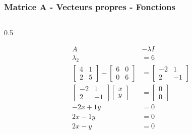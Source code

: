 \begin{frame}
    \frametitle{Matrice A - Vecteurs propres - Fonctions}

		\begin{columns}
		\begin{column}{0.5\textwidth}

			\scriptsize{\begin{align}
			A&-\lambda I \nonumber \\
				\lambda_2&=6 \nonumber \\
				\begin{bmatrix} 4&1\\ 2&5 \end{bmatrix}
				  - \begin{bmatrix} 6&0\\ 0&6 \end{bmatrix}
				  &= \begin{bmatrix} -2&1\\ 2&-1 \end{bmatrix} \\
				\begin{bmatrix} -2&1\\ 2&-1 \end{bmatrix}
				  \begin{bmatrix} x\\y \end{bmatrix}
				  &= \begin{bmatrix} 0\\0 \end{bmatrix} \\
				-2x+1y&=0 \\
				2x-1y&=0 \\
				2x-y&=0
			\end{align}}
		\end{column}


\end{columns}
\end{frame}
